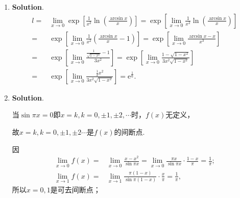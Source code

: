 \documentclass[../main.tex]{subfiles}
\begin{document}
\begin{enumerate}
          \textbf{法二.}由题意得$\lim_{x\to0}\frac{u}{cx^{k}}=1$. 而
          \[
              \begin{aligned}
                  \lim_{x\to0}\frac{u}{cx^k}= {} & \frac{\tan x-\sin x}{cx^k(\sqrt{1+\tan x}+\sqrt{1+\sin x})}              \\
                  = {}                           & \lim_{x\to0}\frac{\tan x(1-\cos x)}{2cx^k}                               \\
                  = {}                           & \lim_{x\to0}\frac{\frac{1}{2}x^3}{2cx^k}=\lim_{x\to0}\frac{x^{3-k}}{4c},
              \end{aligned}
          \]
          故$3-k=0,4c=1$，即$k=3,c=\frac{1}{4}$.

    \item \textbf{Solution}.
          \[
              \begin{aligned}
                  l= {} & \lim_{x\to0}\exp\left[{\frac{1}{x^2}\ln\left(\frac{\arcsin x}{x}\right)}\right]=\exp\left[{\lim\limits_{x\to0}\frac{1}{x^2}\ln\left(\frac{\arcsin x}{x}\right)}\right] \\
                  = {}  & \exp\left[{\lim\limits_{x\to0}\frac{1}{x^2}\left(\frac{\arcsin x}{x}-1\right)}\right]=\exp\left[{\lim\limits_{x\to0}\frac{\arcsin x-x}{x^3}}\right]                    \\
                  = {}  & \exp\left[{\lim\limits_{x\to0}\frac{\frac{1}{\sqrt{1-x^2}}-1}{3x^2}}\right]=\exp\left[{\lim\limits_{x\to0}\frac{1-\sqrt{1-x^2}}{3x^2\sqrt{1-x^2}}}\right]              \\
                  = {}  & \exp\left[{\lim\limits_{x\to0}\frac{\frac{1}{2}x^2}{3x^2\sqrt{1-x^2}}}\right]=\mathrm{e}^{\frac{1}{6}}.
              \end{aligned}
          \]

    \item \textbf{Solution}.

          当$\sin\pi x=0$即$x=k,k=0,\pm1,\pm2,\cdots$时，$f(x)$无定义，

          故$x=k,k=0,\pm1,\pm2\cdots$是$f(x)$的间断点.

          因
          \[
              \begin{aligned}
                  \lim_{x\to0}f(x)= {} & \lim_{x\to0}\frac{x-x^2}{\sin\pi x}=\lim_{x\to0}\frac{\pi x}{\sin\pi x}\cdot\frac{1-x}{\pi}=\frac{1}{\pi}; \\
                  \lim_{x\to1}f(x)= {} & \lim_{x\to1}\frac{\pi(1-x)}{\sin\pi(1-x)}\cdot\frac{x}{\pi}=\frac{1}{\pi},
              \end{aligned}
          \]
          所以$x=0,1$是可去间断点；


\end{enumerate}
\end{document}
